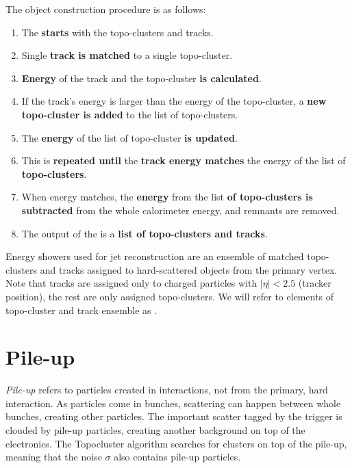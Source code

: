 The object construction procedure is as follows:
\begin{enumerate}
    \item The \PFa \textbf{starts} with the topo-clusters and tracks.
    \item Single \textbf{track is matched} to a single topo-cluster.
    \item \textbf{Energy} of the track and the topo-cluster \textbf{is calculated}.
    \item If the track's energy is larger than the energy of the topo-cluster, a \textbf{new topo-cluster is added} to the list of topo-clusters.
    \item The \textbf{energy} of the list of topo-cluster \textbf{is updated}.
    \item This is \textbf{repeated until} the \textbf{track energy matches} the energy of the list of \textbf{topo-clusters}.
    \item When energy matches, the \textbf{energy} from the list \textbf{of topo-clusters is subtracted} from the whole calorimeter energy, and remnants are removed.
    \item The output of the \PFa is a \textbf{list of topo-clusters and tracks}.
\end{enumerate}

Energy showers used for jet reconstruction are an ensemble of matched topo-clusters and tracks assigned to hard-scattered objects from the primary vertex. 
Note that tracks are assigned only to charged particles with $|\eta| < 2.5$ (tracker position), the rest are only assigned topo-clusters.
We will refer to elements of topo-cluster and track ensemble as \PFOs. 

\section{Pile-up}
\label{sec:pileup}
\emph{Pile-up} refers to particles created in interactions, not from the primary, hard interaction.
As particles come in bunches, scattering can happen between whole bunches, creating other particles.
The important scatter tagged by the trigger is clouded by pile-up particles, creating another background on top of the electronics.
The Topocluster algorithm searches for clusters on top of the pile-up, meaning that the noise $\sigma$ also contains pile-up particles.

